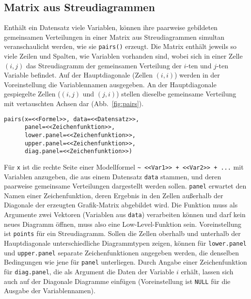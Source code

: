 \subsection{Matrix aus Streudiagrammen}
\label{sec:pairs}

Enthält ein Datensatz viele Variablen, können ihre paarweise gebildeten gemeinsamen Verteilungen in einer Matrix aus Streudiagrammen simultan veranschaulicht werden, wie sie \lstinline!pairs()! erzeugt. Die Matrix enthält jeweils so viele Zeilen und Spalten, wie Variablen vorhanden sind, wobei sich in einer Zelle $(i, j)$ das Streudiagramm der gemeinsamen Verteilung der $i$-ten und $j$-ten Variable befindet. Auf der Hauptdiagonale (Zellen $(i, i)$) werden in der Voreinstellung die Variablennamen ausgegeben. An der Hauptdiagonale gespiegelte Zellen ($(i, j)$ und $(j, i)$) stellen dieselbe gemeinsame Verteilung mit vertauschten Achsen dar (Abb.\ \ref{fig:pairs}).
\begin{lstlisting}
pairs(x=<<Formel>>, data=<<Datensatz>>,
      panel=<<Zeichenfunktion>>,
      lower.panel=<<Zeichenfunktion>>,
      upper.panel=<<Zeichenfunktion>>,
      diag.panel=<<Zeichenfunktion>>)
\end{lstlisting}

Für \lstinline!x! ist die rechte Seite einer Modellformel \lstinline!~ <<Var1>> + <<Var2>> + ...! mit Variablen anzugeben, die aus einem Datensatz \lstinline!data! stammen, und deren paarweise gemeinsame Verteilungen dargestellt werden sollen. \lstinline!panel! erwartet den Namen einer Zeichenfunktion, deren Ergebnis in den Zellen außerhalb der Diagonale der erzeugten Grafik-Matrix abgebildet wird. Die Funktion muss als Argumente zwei Vektoren (Variablen aus \lstinline!data!) verarbeiten können und darf kein neues Diagramm öffnen, muss also eine Low-Level-Funktion sein. Voreinstellung ist \lstinline!points! für ein Streudiagramm. Sollen die Zellen oberhalb und unterhalb der Hauptdiagonale unterschiedliche Diagrammtypen zeigen, können für \lstinline!lower.panel! und \lstinline!upper.panel! separate Zeichenfunktionen angegeben werden, die denselben Bedingungen wie jene für \lstinline!panel! unterliegen. Durch Angabe einer Zeichenfunktion für \lstinline!diag.panel!, die als Argument die Daten der Variable $i$ erhält, lassen sich auch auf der Diagonale Diagramme einfügen (Voreinstellung ist \lstinline!NULL! für die Ausgabe der Variablennamen).

